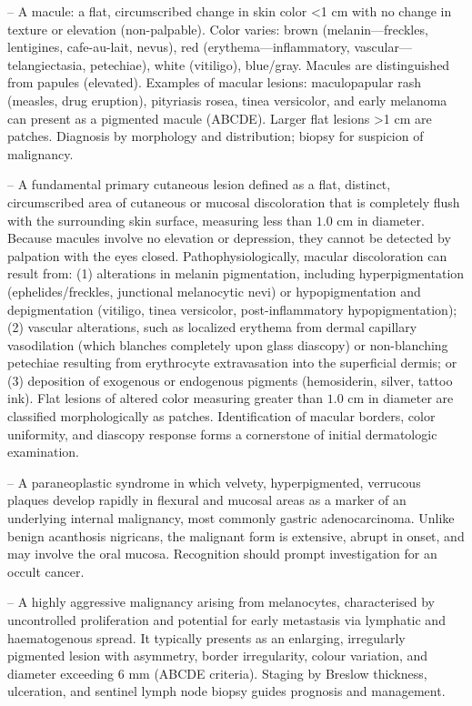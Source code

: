-- A macule: a flat, circumscribed change in skin color <1 cm with no change in texture or elevation (non-palpable). Color varies: brown (melanin—freckles, lentigines, cafe-au-lait, nevus), red (erythema—inflammatory, vascular—telangiectasia, petechiae), white (vitiligo), blue/gray. Macules are distinguished from papules (elevated). Examples of macular lesions: maculopapular rash (measles, drug eruption), pityriasis rosea, tinea versicolor, and early melanoma can present as a pigmented macule (ABCDE). Larger flat lesions >1 cm are patches. Diagnosis by morphology and distribution; biopsy for suspicion of malignancy.

-- A fundamental primary cutaneous lesion defined as a flat, distinct, circumscribed area of cutaneous or mucosal discoloration that is completely flush with the surrounding skin surface, measuring less than $1.0\text{ cm}$ in diameter. Because macules involve no elevation or depression, they cannot be detected by palpation with the eyes closed. Pathophysiologically, macular discoloration can result from: (1) alterations in melanin pigmentation, including hyperpigmentation (ephelides/freckles, junctional melanocytic nevi) or hypopigmentation and depigmentation (vitiligo, tinea versicolor, post-inflammatory hypopigmentation); (2) vascular alterations, such as localized erythema from dermal capillary vasodilation (which blanches completely upon glass diascopy) or non-blanching petechiae resulting from erythrocyte extravasation into the superficial dermis; or (3) deposition of exogenous or endogenous pigments (hemosiderin, silver, tattoo ink). Flat lesions of altered color measuring greater than $1.0\text{ cm}$ in diameter are classified morphologically as patches. Identification of macular borders, color uniformity, and diascopy response forms a cornerstone of initial dermatologic examination.

-- A paraneoplastic syndrome in which velvety, hyperpigmented, verrucous plaques develop rapidly in flexural and mucosal areas as a marker of an underlying internal malignancy, most commonly gastric adenocarcinoma. Unlike benign acanthosis nigricans, the malignant form is extensive, abrupt in onset, and may involve the oral mucosa. Recognition should prompt investigation for an occult cancer.

-- A highly aggressive malignancy arising from melanocytes, characterised by uncontrolled proliferation and potential for early metastasis via lymphatic and haematogenous spread. It typically presents as an enlarging, irregularly pigmented lesion with asymmetry, border irregularity, colour variation, and diameter exceeding 6 mm (ABCDE criteria). Staging by Breslow thickness, ulceration, and sentinel lymph node biopsy guides prognosis and management.

